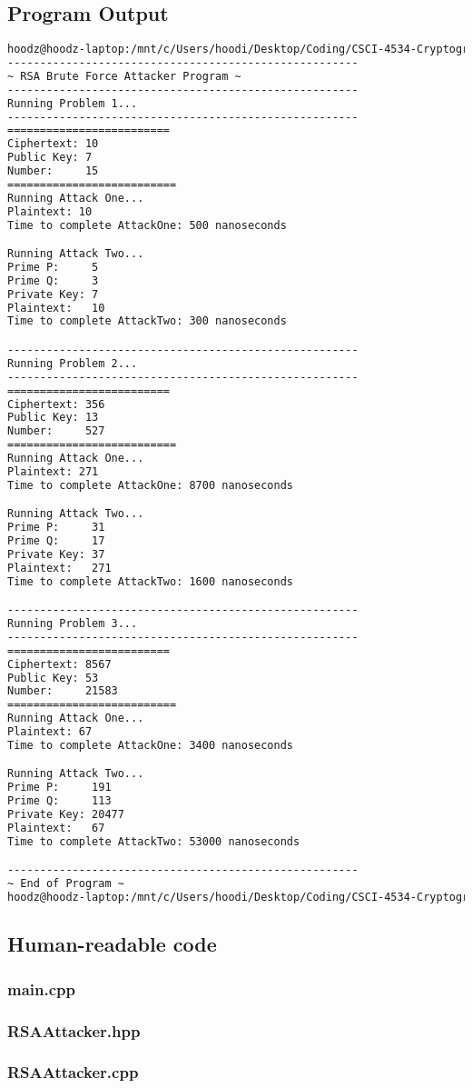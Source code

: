 \documentclass{article}
\begin{document}
    \subsection*{Program Output}
    \begin{lstlisting}[language=bash]
    hoodz@hoodz-laptop:/mnt/c/Users/hoodi/Desktop/Coding/CSCI-4534-Cryptography/Homework-2$ ./main
------------------------------------------------------
~ RSA Brute Force Attacker Program ~
------------------------------------------------------
Running Problem 1...
------------------------------------------------------
=========================
Ciphertext: 10
Public Key: 7
Number:     15
==========================
Running Attack One...
Plaintext: 10
Time to complete AttackOne: 500 nanoseconds

Running Attack Two...
Prime P:     5
Prime Q:     3
Private Key: 7
Plaintext:   10
Time to complete AttackTwo: 300 nanoseconds

------------------------------------------------------
Running Problem 2...
------------------------------------------------------
=========================
Ciphertext: 356
Public Key: 13
Number:     527
==========================
Running Attack One...
Plaintext: 271
Time to complete AttackOne: 8700 nanoseconds

Running Attack Two...
Prime P:     31
Prime Q:     17
Private Key: 37
Plaintext:   271
Time to complete AttackTwo: 1600 nanoseconds

------------------------------------------------------
Running Problem 3...
------------------------------------------------------
=========================
Ciphertext: 8567
Public Key: 53
Number:     21583
==========================
Running Attack One...
Plaintext: 67
Time to complete AttackOne: 3400 nanoseconds

Running Attack Two...
Prime P:     191
Prime Q:     113
Private Key: 20477
Plaintext:   67
Time to complete AttackTwo: 53000 nanoseconds

------------------------------------------------------
~ End of Program ~
hoodz@hoodz-laptop:/mnt/c/Users/hoodi/Desktop/Coding/CSCI-4534-Cryptography/Homework-2$
    \end{lstlisting}
    
    \newpage

    \lstset{style=myStyle}
    
    \subsection*{Human-readable code}
    \subsubsection*{main.cpp}
    
    \subsubsection*{RSAAttacker.hpp}
    
    
    \subsubsection*{RSAAttacker.cpp}
    
    
    
\end{document}
